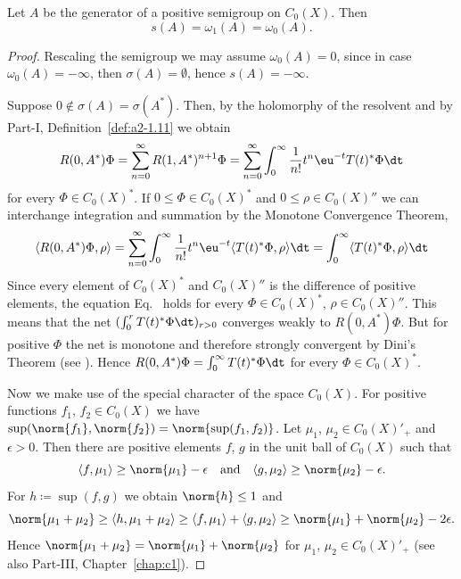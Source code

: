 \begin{theorem}\label{thm:b4-1.4}%
Let $A$ be the generator of a positive semigroup on $C_{0}(X)$. 
Then
\[
   s(A) = \omega_1(A) = \omega_{0}(A).%
\]
\end{theorem}
\begin{proof}
Rescaling the semigroup we may assume $\omega_{0}(A) = 0$, 
since in case $\omega_{0}(A) = -\infty$, then $\sigma(A) = \emptyset$, hence $s(A) = -\infty$.

Suppose $0 \notin \sigma(A) = \sigma(A^*)$. 
Then, by the holomorphy of the resolvent and by Part-I, Definition~\ref{def:a2-1.11} we obtain
\[
   R(0,A^*)\Phi = \sum_{n=0}^{\infty} R(1,A^*)^{n+1}\Phi = \sum_{n=0}^{\infty} \int_0^{\infty} \frac{1}{n!} t^n \eu^{-t}T(t)^*\Phi \dt
\]  
 for every  $\Phi \in C_{0}(X)^*$. 
 If\/ $0 \leq \Phi \in C_{0}(X)^*$ and $0 \leq \rho \in C_{0}(X)''$ we can interchange integration and summation by the Monotone Convergence Theorem, \ie
\begin{equation}\label{eq:b4-1.3}
   \langle R(0,A^*)\Phi,\rho \rangle = \sum_{n=0}^{\infty} \int_0^{\infty} \frac{1}{n!} t^n \eu^{-t}\langle T(t)^*\Phi,\rho \rangle \dt = \int_0^{\infty} \langle T(t)^*\Phi,\rho \rangle \dt
\end{equation}
Since every element of\/ $C_{0}(X)^*$ and $C_{0}(X)''$ is the difference of positive
elements, the equation Eq.~ holds for every $\Phi \in C_{0}(X)^*$, $\rho \in C_{0}(X)''$. 
This means that the net $(\int_0^r T(t)^*\Phi \dt)_{r > 0}$ converges weakly to $R(0,A^*)\Phi$. 
But for positive $\Phi$ the net is monotone and therefore strongly convergent by Dini's Theorem (see \textcite[II.Theorem~5.9]{schaefer:1974}). 
Hence $R(0,A^*)\Phi = \int_0^{\infty} T(t)^*\Phi \dt$ for every $\Phi \in C_{0}(X)^*$.

Now we make use of the special character of the space $C_{0}(X)$. 
For positive functions $f_1$, $f_2 \in C_{0}(X)$ we have $\sup(\norm{f_1},\norm{f_2}) = \norm{\sup(f_1,f_2)}$. 
Let $\mu_1$, $\mu_2 \in C_{0}(X)'_+$ and $\epsilon  >  0$. 
Then there are positive elements $f$, $g$ in the unit ball of\/ $C_{0}(X)$ such that 
%
\[
	\langle f,\mu_1 \rangle \geq \norm{\mu_1} - \epsilon 
	\quad \text{and} \quad
	\langle g,\mu_2 \rangle \geq \norm{\mu_2} - \epsilon.
\]
%
For $h \coloneq \sup(f,g)$ we obtain $\norm{h} \leq 1$ and 
%
\[
	 \norm{\mu_1 + \mu_2} \geq \langle h,\mu_1 + \mu_2 \rangle \geq \langle f,\mu_1 \rangle + \langle g,\mu_2 \rangle \geq \norm{\mu_1} + \norm{\mu_2} - 2\epsilon .
\]
%
Hence $\norm{\mu_1 + \mu_2} = \norm{\mu_1} + \norm{\mu_2}$ for $\mu_1$, $\mu_2 \in C_{0}(X)'_+$ (see also Part-III, Chapter~\ref{chap:c1}).


\end{proof}

